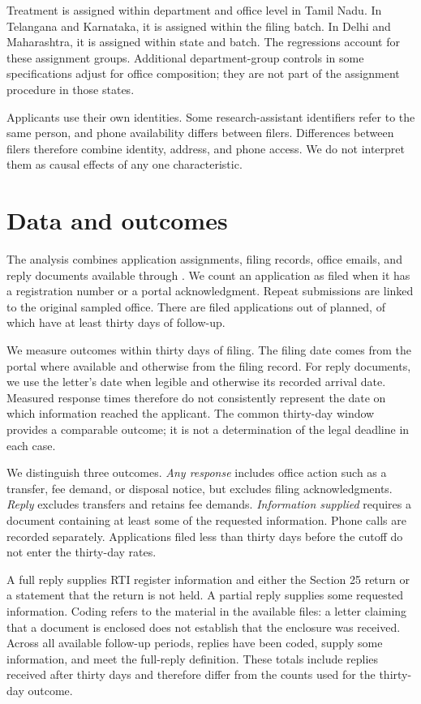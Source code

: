 \documentclass[11pt]{article}
\begin{document}
Treatment is assigned within department and office level in Tamil Nadu. In Telangana and Karnataka, it is assigned within the filing batch. In Delhi and Maharashtra, it is assigned within state and batch. The regressions account for these assignment groups. Additional department-group controls in some specifications adjust for office composition; they are not part of the assignment procedure in those states.

Applicants use their own identities. Some research-assistant identifiers refer to the same person, and phone availability differs between filers. Differences between filers therefore combine identity, address, and phone access. We do not interpret them as causal effects of any one characteristic.

\section{Data and outcomes}
The analysis combines application assignments, filing records, office emails, and reply documents available through \rtiasof{}. We count an application as filed when it has a registration number or a portal acknowledgment. Repeat submissions are linked to the original sampled office. There are \rtinfiled{} filed applications out of \rtindrawn{} planned, of which \rtinpastthirty{} have at least thirty days of follow-up.

We measure outcomes within thirty days of filing. The filing date comes from the portal where available and otherwise from the filing record. For reply documents, we use the letter's date when legible and otherwise its recorded arrival date. Measured response times therefore do not consistently represent the date on which information reached the applicant. The common thirty-day window provides a comparable outcome; it is not a determination of the legal deadline in each case.

We distinguish three outcomes. \emph{Any response} includes office action such as a transfer, fee demand, or disposal notice, but excludes filing acknowledgments. \emph{Reply} excludes transfers and retains fee demands. \emph{Information supplied} requires a document containing at least some of the requested information. Phone calls are recorded separately. Applications filed less than thirty days before the cutoff do not enter the thirty-day rates.

A full reply supplies RTI register information and either the Section 25 return or a statement that the return is not held. A partial reply supplies some requested information. Coding refers to the material in the available files: a letter claiming that a document is enclosed does not establish that the enclosure was received. Across all available follow-up periods, \rtincoded{} replies have been coded, \rtininformed{} supply some information, and \rtinfull{} meet the full-reply definition. These totals include replies received after thirty days and therefore differ from the counts used for the thirty-day outcome.
\end{document}
